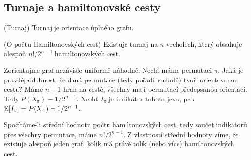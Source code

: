 
\subsection{Turnaje a hamiltonovské cesty}

\df (Turnaj) Turnaj je orientace úplného grafu.

\vt (O počtu Hamiltonovských cest) Existuje turnaj na $n$ vrcholech, který 
obsahuje alespoň $n!/2^{n-1}$ hamiltonovských cest.

\dk Zorientujme graf nezávisle uniformě náhodně. Nechť máme permutaci $\pi$.  
Jaká je pravděpodobnost, že daná permutace (tedy pořadí vrcholů) tvoří 
orientovanou cestu? Máme $n-1$ hran na cestě, všechny mají permutací 
předepsanou orientaci. Tedy $P(X_\pi)= 1/2^{n-1}$. Nechť $I_\pi$ je indikátor 
tohoto jevu, pak $\mathbb{E}[I_\pi] = P(X_\pi) = 1/2^{n-1}$.

Spočítáme-li střední hodnotu počtu hamiltonovských cest, tedy součet indikátorů 
přes všechny permutace, máme $n!/2^{n-1}$. Z vlastností střední hodnoty víme, 
že existuje alespoň jeden graf, kolik má právě tolik (nebo více) 
hamiltonovských cest.
